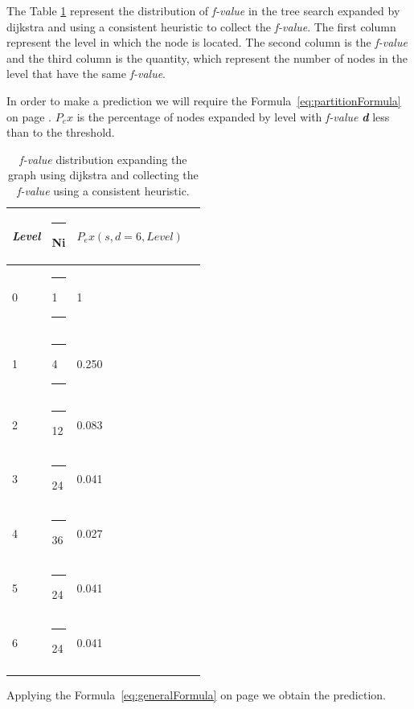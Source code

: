 \documentclass[11pt,a4paper,oneside]{report}
\begin{document}
The Table \ref{table:tabledijkstra} represent the distribution of \textit{f-value} in the tree search expanded by dijkstra and using a consistent heuristic to collect the \textit{f-value}. The first column represent the level in which the node is located. The second column is the \textit{f-value} and the third column is the quantity, which represent the number of nodes in the level that have the same \textit{f-value}.
\newline

In order to make a prediction we will require the Formula~\eqref{eq:partitionFormula} on page \pageref{eq:partitionFormula}. $P_ex$ is the percentage of nodes expanded by level with \textit{f-value} \textbf{\textit{d}} less than to the threshold.

\footnotesize  %
\setlength\LTleft{100pt}            %
\setlength\LTright{200pt}           %
\begin{longtable}{@{\extracolsep{\fill}} llll @{}} %
\hline
\textit{Level} &\rule{4pt}{0ex} Ni &\rule{0pt}{0ex} $P_ex(s, d = 6, \textit{Level})$ \\ \hline
0     &\rule{4pt}{0ex} 1\rule{16pt}{0ex}  & 1                    \\ \hline
1     &\rule{4pt}{0ex} 4\rule{4pt}{0ex}  & 0.250                \\ \hline
2     &\rule{4pt}{0ex} 12 & 0.083                \\ \hline
3     &\rule{4pt}{0ex} 24 & 0.041                \\ \hline
4     &\rule{4pt}{0ex} 36 & 0.027                \\ \hline
5     &\rule{4pt}{0ex} 24 & 0.041                \\ \hline
6     &\rule{4pt}{0ex} 24 & 0.041                \\ \hline
\caption{\textit{f-value} distribution expanding the graph using dijkstra and collecting the \textit{f-value} using a consistent heuristic.}
\label{table:tabledijkstra}
\end{longtable}

Applying the Formula~\eqref{eq:generalFormula} on page \pageref{eq:generalFormula} we obtain the prediction.
\end{document}
